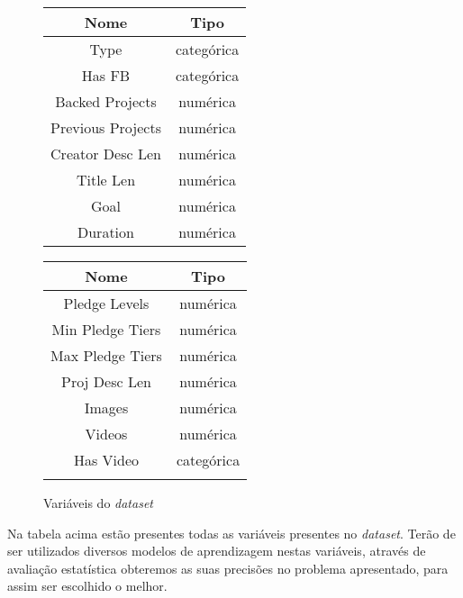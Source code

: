 \begin{figure}[H]
    \begin{center}
    \setlength{\arrayrulewidth}{0.5mm}
    \renewcommand{\arraystretch}{1.5}
    \begin{tabular}{ |c|c| } 
    \hline
    \textbf{Nome} & \textbf{Tipo}\\ 
    \hline
    Type & categórica\\ 
    \hline
    Has FB & categórica\\ 
    \hline
    Backed Projects & numérica\\ 
    \hline
    Previous Projects & numérica\\ 
    \hline
    Creator Desc Len & numérica\\ 
    \hline
    Title Len & numérica\\ 
    \hline
    Goal & numérica\\ 
    \hline
    Duration & numérica\\ 
    \hline
    \end{tabular}
    \begin{tabular}{ |c|c| } 
    \hline
    \textbf{Nome} & \textbf{Tipo}\\ 
    \hline
    Pledge Levels & numérica\\ 
    \hline
    Min Pledge Tiers & numérica\\ 
    \hline
    Max Pledge Tiers & numérica\\ 
    \hline
    Proj Desc Len & numérica\\ 
    \hline
    Images & numérica\\ 
    \hline
    Videos & numérica\\ 
    \hline
    Has Video & categórica\\ 
    \hline
    \color{red}{Funded} & \color{red}{categórica}\\ 
    \hline
    \end{tabular}
    \end{center}
     \caption{Variáveis do \textit{dataset}}
    \label{fig:my_label}
\end{figure}

Na tabela acima estão presentes todas as variáveis presentes no \textit{dataset}. Terão de ser utilizados diversos modelos de aprendizagem nestas variáveis, através de avaliação estatística obteremos as suas precisões no problema apresentado, para assim ser escolhido o melhor.
